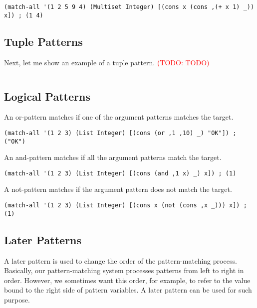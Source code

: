\documentclass[acmlarge]{acmart}
\newcommand{\todo}[1]{\textcolor{red}{(TODO: #1)}}
\begin{document}
\begin{lstlisting}[language=egison]
(match-all '(1 2 5 9 4) (Multiset Integer) [(cons x (cons ,(+ x 1) _)) x]) ; (1 4)
\end{lstlisting}

\subsection{Tuple Patterns}

Next, let me show an example of a tuple pattern.
\todo{TODO}

\begin{lstlisting}[language=egison]
\end{lstlisting}

\subsection{Logical Patterns}

An or-pattern matches if one of the argument patterns matches the target.

\begin{lstlisting}[language=egison]
(match-all '(1 2 3) (List Integer) [(cons (or ,1 ,10) _) "OK"]) ; ("OK")
\end{lstlisting}

An and-pattern matches if all the argument patterns match the target.

\begin{lstlisting}[language=egison]
(match-all '(1 2 3) (List Integer) [(cons (and ,1 x) _) x]) ; (1)
\end{lstlisting}

A not-pattern matches if the argument pattern does not match the target.

\begin{lstlisting}[language=egison]
(match-all '(1 2 3) (List Integer) [(cons x (not (cons ,x _))) x]) ; (1)
\end{lstlisting}

\subsection{Later Patterns}

A later pattern is used to change the order of the pattern-matching process. Basically, our pattern-matching system processes patterns from left to right in order. However, we sometimes want this order, for example, to refer to the value bound to the right side of pattern variables. A later pattern can be used for such purpose.
\end{document}
